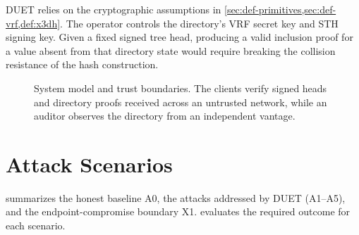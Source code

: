 DUET relies on the cryptographic assumptions in
\cref{sec:def-primitives,sec:def-vrf,def:x3dh}. The operator controls the directory's VRF secret key
and STH signing key. Given a fixed signed tree head, producing a valid inclusion proof for a value
absent from that directory state would require breaking the collision resistance of the hash
construction.

\begin{figure}[t]
\centering

\caption[System model and trust boundaries.]{System model and trust boundaries. The clients verify
signed heads and directory proofs received across an untrusted network, while an auditor observes
the directory from an independent vantage.}
\label{fig:threat-arch}
\end{figure}

\FloatBarrier
\section{Attack Scenarios}\label{sec:threat-scenarios}

 summarizes the honest baseline A0, the attacks addressed by DUET
(A1--A5), and the endpoint-compromise boundary X1.  evaluates the required outcome
for each scenario.

